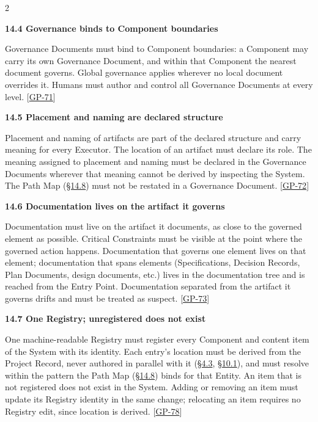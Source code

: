 \begin{multicols}{2}
\hypertarget{nss-14.4}{}

\par\smallskip\noindent\textbf{14.4 Governance binds to Component boundaries}\par\nopagebreak

Governance Documents must bind to Component boundaries: a Component may carry its own Governance Document, and within that Component the nearest document governs. Global governance applies wherever no local document overrides it. Humans must author and control all Governance Documents at every level. [\hyperlink{gp-71}{GP-71}]

\hypertarget{nss-14.5}{}

\par\smallskip\noindent\textbf{14.5 Placement and naming are declared structure}\par\nopagebreak

Placement and naming of artifacts are part of the declared structure and carry meaning for every Executor. The location of an artifact must declare its role. The meaning assigned to placement and naming must be declared in the Governance Documents wherever that meaning cannot be derived by inspecting the System. The Path Map (\hyperlink{nss-14.8}{\S14.8}) must not be restated in a Governance Document. [\hyperlink{gp-72}{GP-72}]

\hypertarget{nss-14.6}{}

\par\smallskip\noindent\textbf{14.6 Documentation lives on the artifact it governs}\par\nopagebreak

Documentation must live on the artifact it documents, as close to the governed element as possible. Critical Constraints must be visible at the point where the governed action happens. Documentation that governs one element lives on that element; documentation that spans elements (Specifications, Decision Records, Plan Documents, design documents, etc.) lives in the documentation tree and is reached from the Entry Point. Documentation separated from the artifact it governs drifts and must be treated as suspect. [\hyperlink{gp-73}{GP-73}]

\hypertarget{nss-14.7}{}

\par\smallskip\noindent\textbf{14.7 One Registry; unregistered does not exist}\par\nopagebreak

One machine-readable Registry must register every Component and content item of the System with its identity. Each entry's location must be derived from the Project Record, never authored in parallel with it (\hyperlink{nss-4.3}{\S4.3}, \hyperlink{nss-10.1}{\S10.1}), and must resolve within the pattern the Path Map (\hyperlink{nss-14.8}{\S14.8}) binds for that Entity. An item that is not registered does not exist in the System. Adding or removing an item must update its Registry identity in the same change; relocating an item requires no Registry edit, since location is derived. [\hyperlink{gp-78}{GP-78}]


\end{multicols}
